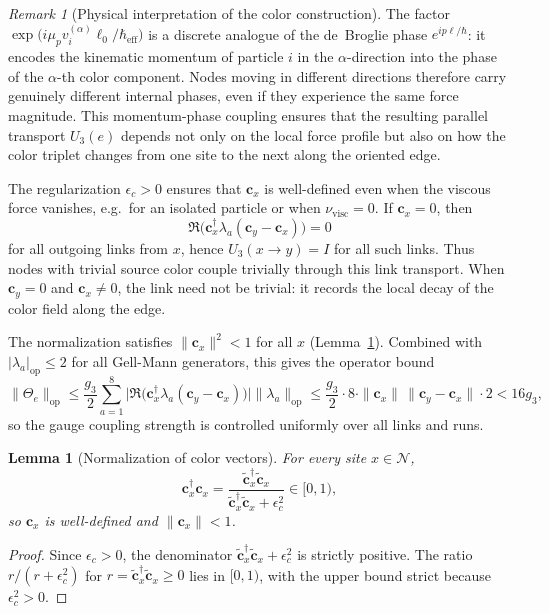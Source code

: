 \documentclass[11pt]{article}
\newtheorem{lemma}[theorem]{Lemma}
\theoremstyle{remark}
\newtheorem{remark}[theorem]{Remark}
\newcommand{\mcN}{\mathcal N}
\begin{document}
\begin{remark}[Physical interpretation of the color construction]
\label{rem:color-physics}
The factor
$\exp\!\bigl(i\mu_p v_i^{(\alpha)} \ell_0/\hbar_{\mathrm{eff}}\bigr)$
is a discrete analogue of the de~Broglie phase $e^{ip\ell/\hbar}$:
it encodes the kinematic momentum of particle $i$ in the $\alpha$-direction into the
phase of the $\alpha$-th color component.
Nodes moving in different directions therefore carry genuinely different
internal phases, even if they experience the same force magnitude.
This momentum-phase coupling ensures that the resulting parallel transport
$U_3(e)$ depends not only on the local force profile but also on how the color
triplet changes from one site to the next along the oriented edge.

The regularization $\epsilon_c>0$ ensures that $\mathbf c_x$ is well-defined
even when the viscous force vanishes, e.g.\ for an isolated particle or when
$\nu_{\mathrm{visc}}=0$.
If $\mathbf c_x=0$, then
\[
\Re\!\bigl(\mathbf c_x^\dagger\lambda_a(\mathbf c_y-\mathbf c_x)\bigr)=0
\]
for all outgoing links from $x$, hence $U_3(x\to y)=I$ for all such links.
Thus nodes with trivial source color couple trivially through this link
transport. When $\mathbf c_y=0$ and $\mathbf c_x\neq0$, the link need not be
trivial: it records the local decay of the color field along the edge.

The normalization satisfies $\|\mathbf c_x\|^2<1$ for all $x$ (Lemma~\ref{lem:color-norm}).
Combined with $|\lambda_a|_\mathrm{op}\le 2$ for all Gell-Mann generators,
this gives the operator bound
\[
\|\Theta_e\|_{\mathrm{op}}
\le \frac{g_3}{2}\sum_{a=1}^8
\bigl|\Re\!\bigl(\mathbf c_x^\dagger\lambda_a(\mathbf c_y-\mathbf c_x)\bigr)\bigr|
\|\lambda_a\|_{\mathrm{op}}
\le \frac{g_3}{2}\cdot 8\cdot \|\mathbf c_x\|\,\|\mathbf c_y-\mathbf c_x\|\cdot 2
< 16g_3,
\]
so the gauge coupling strength is controlled uniformly over all links and runs.
\end{remark}

\begin{lemma}[Normalization of color vectors]
\label{lem:color-norm}
For every site $x\in\mcN$,
\[
\mathbf c_x^\dagger\mathbf c_x
=\frac{\tilde{\mathbf c}_x^\dagger\tilde{\mathbf c}_x}{\tilde{\mathbf c}_x^\dagger\tilde{\mathbf c}_x+\epsilon_c^2}\in[0,1),
\]
so $\mathbf c_x$ is well-defined and $\|\mathbf c_x\|<1$.
\end{lemma}
\begin{proof}
Since $\epsilon_c>0$, the denominator $\tilde{\mathbf c}_x^\dagger\tilde{\mathbf c}_x+\epsilon_c^2$
is strictly positive.
The ratio $r/(r+\epsilon_c^2)$ for $r=\tilde{\mathbf c}_x^\dagger\tilde{\mathbf c}_x\ge0$ lies in $[0,1)$,
with the upper bound strict because $\epsilon_c^2>0$.
\end{proof}
\end{document}
